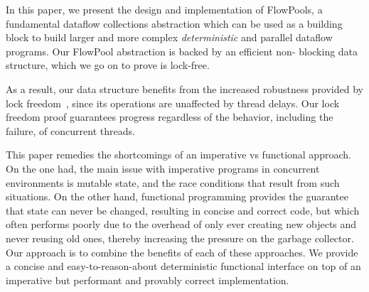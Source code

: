 \documentclass[runningheads,a4paper]{llncs}
\begin{document}
In this paper, we present the design and implementation of FlowPools, a
fundamental dataflow collections abstraction which can be used as a building
block to build larger and more complex \textit{deterministic} and parallel
dataflow programs. Our FlowPool abstraction is backed by an efficient non-
blocking data structure, which we go on to prove is lock-free.

As a result, our data structure benefits from the increased robustness
provided by lock freedom~\cite{Herlihy90}, since its operations are unaffected
by thread delays. Our lock freedom proof guarantees progress regardless of the
behavior, including the failure, of concurrent threads.



% 




This paper remedies the shortcomings of an imperative vs functional approach.
On the one had, the main issue with imperative programs in concurrent
environments is mutable state, and the race conditions that result from such
situations. On the other hand, functional programming provides the guarantee
that state can never be changed, resulting in concise and correct code, but
which often performs poorly due to the overhead of only ever creating new
objects and never reusing old ones, thereby increasing the pressure on the
garbage collector. Our approach is to combine the benefits of each of these
approaches. We provide a concise and easy-to-reason-about deterministic
functional interface on top of an imperative but performant and provably
correct implementation.
\end{document}
